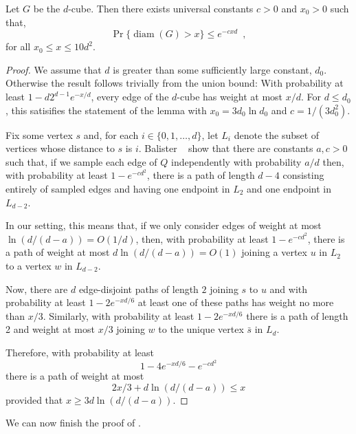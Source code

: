 \documentclass{patmorin}
\DeclareMathOperator{\diam}{diam}
\begin{document}
\begin{lem}
   Let $G$ be the $d$-cube.  Then there exists universal constants
   $c>0$ and $x_0>0$ such that,
   \[ 
     \Pr\{\diam(G) > x\} \le e^{-cxd} \enspace ,
   \]
   for all $x_0 \le x \le 10d^2$.
\end{lem}

\begin{proof}
   We assume that $d$ is greater than some sufficiently large constant,
   $d_0$.  Otherwise the result follows trivially from the union bound:
   With probability at least $1-d2^{d-1} e^{-x/d}$, every edge of the
   $d$-cube has weight at most $x/d$.  For $d \le d_0$, this satisifies
   the statement of the lemma with $x_0=3d_0\ln d_0$ and $c=1/(3d_0^2)$.

   Fix some vertex $s$ and, for each $i\in\{0,1,\ldots,d\}$, let
   $L_i$ denote the subset of vertices whose distance to $s$ is $i$.
   Balister \etal\ \cite[Lemma~4]{balister.bollobas.ea:first-passage}
   show that there are constants $a,c>0$ such that, if we sample each edge
   of $Q$ independently with probability $a/d$ then, with probability
   at least $1-e^{-cd^2}$, there is a path of length $d-4$ consisting
   entirely of sampled edges and having one endpoint in $L_2$ and one
   endpoint in $L_{d-2}$.

   In our setting, this means that, if we only consider edges of weight
   at most $\ln(d/(d-a)) = O(1/d)$, then, with probability at least
   $1-e^{-cd^2}$, there is a path of weight at most $d\ln(d/(d-a))=O(1)$
   joining a vertex $u$ in $L_2$ to a vertex $w$ in $L_{d-2}$.

   Now, there are $d$ edge-disjoint paths of length $2$ joining $s$ to $u$
   and with probability at least $1-2e^{-x d/6}$ at least one of these
   paths has weight no more than $x/3$.  Similarly, with probability
   at least $1-2e^{-xd/6}$ there is a path of length 2 and weight at
   most $x/3$ joining $w$ to the unique vertex $\bar{s}$ in $L_d$.

   Therefore, with probability at least
   \[
      1-4e^{-xd/6}-e^{-cd^2}
   \]
   there is a path of weight at most
   \[
          2x/3 + d\ln(d/(d-a))  \le x
   \]
   provided that $x \ge 3d\ln(d/(d-a))$.
\end{proof}

We can now finish the proof of .
\end{document}
